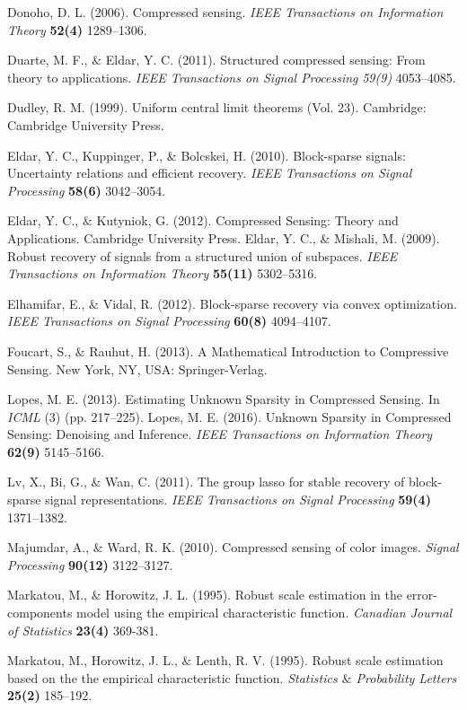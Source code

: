 \documentclass[journal,onecolumn]{IEEEtran}
\begin{document}
\begin{thebibliography}{1}
Donoho, D. L. (2006). Compressed sensing. \textit{IEEE Transactions on Information Theory}
\textbf{52(4)} 1289--1306.

Duarte, M. F., $\&$ Eldar, Y. C. (2011). Structured compressed sensing: From theory to applications. \textit{IEEE Transactions on Signal Processing}
\textit{59(9)} 4053--4085.

Dudley, R. M. (1999). Uniform central limit theorems (Vol. 23). Cambridge: Cambridge University Press.

Eldar, Y. C., Kuppinger, P., $\&$ Bolcskei, H. (2010).
Block-sparse signals: Uncertainty relations and efficient recovery. \textit{IEEE Transactions on Signal Processing}
\textbf{58(6)} 3042--3054.

Eldar, Y. C., $\&$ Kutyniok, G. (2012). Compressed Sensing: Theory and Applications. Cambridge University Press.
Eldar, Y. C., $\&$ Mishali, M. (2009).
Robust recovery of signals from a structured union of subspaces. \textit{IEEE Transactions on Information Theory}
\textbf{55(11)} 5302--5316.

Elhamifar, E., $\&$ Vidal, R. (2012). Block-sparse recovery via convex optimization. \textit{IEEE Transactions on Signal Processing}
\textbf{60(8)} 4094--4107.

Foucart, S., $\&$ Rauhut, H. (2013). A Mathematical Introduction to Compressive Sensing. New York, NY, USA: Springer-Verlag.

Lopes, M. E. (2013). Estimating Unknown Sparsity in Compressed Sensing. In \textit{ICML} (3) (pp. 217--225).
Lopes, M. E. (2016).
Unknown Sparsity in Compressed Sensing: Denoising and Inference. \textit{IEEE Transactions on Information Theory}
\textbf{62(9)} 5145--5166.

Lv, X., Bi, G., $\&$ Wan, C. (2011). The group lasso for stable recovery of block-sparse signal representations. \textit{IEEE Transactions on Signal Processing}
\textbf{59(4)} 1371--1382.

Majumdar, A., $\&$ Ward, R. K. (2010). Compressed sensing of color images. \textit{Signal Processing}
\textbf{90(12)} 3122--3127.

Markatou, M., $\&$ Horowitz, J. L. (1995). Robust scale estimation in the error-components model using the empirical characteristic function.
\textit{Canadian Journal of Statistics}
\textbf{23(4)} 369-381.

Markatou, M., Horowitz, J. L., $\&$ Lenth, R. V. (1995). Robust scale estimation based on the the empirical characteristic function. \textit{Statistics $\&$ Probability Letters}
\textbf{25(2)} 185--192.


\end{thebibliography}
\end{document}
